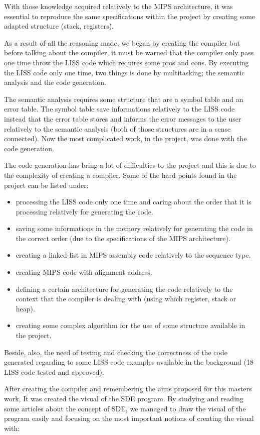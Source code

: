 \documentclass[
  oneside,
  11pt, a4paper,
  footinclude=true,
  headinclude=true,
  cleardoublepage=empty
]{scrbook}
\begin{document}
With those knowledge acquired relatively to the MIPS architecture, it was essential to reproduce the same specifications within the project by creating some adapted structure (stack, registers).

As a result of all the reasoning made, we began by creating the compiler but before talking about the compiler, it must be warned that the compiler only pass one time throw the LISS code which requires some pros and cons. By executing the LISS code only one time, two things is done by multitasking; the semantic analysis and the code generation. 

The semantic analysis requires some structure that are a symbol table and an error table.
The symbol table save informations relatively to the LISS code instead that the error table stores and informs the error messages to the user relatively to the semantic analysis (both of those structures are in a sense connected). Now the most complicated work, in the project, was done with the code generation.

The code generation has bring a lot of difficulties to the project and this is due to the complexity of creating a compiler.
Some of the hard points found in the project can be listed under:
\begin{itemize}
\item processing the LISS code only one time and  caring about the order that it is processing relatively for generating the code.
\item saving some informations in the memory relatively for generating the code in the correct order (due to the specifications of the MIPS architecture).
\item creating a linked-list in MIPS assembly code relatively to the sequence type.
\item creating MIPS code with alignment address.
\item defining a certain architecture for generating the code relatively to the context that the compiler is dealing with (using which register, stack or heap).
\item creating some complex algorithm for the use of some structure available in the project.
\end{itemize}

Beside, also, the need of testing and checking the correctness of the code generated regarding to some LISS code examples available in the background (18 LISS code tested and approved).

After creating the compiler and remembering the aims proposed for this masters work, It was created the visual of the SDE program. By studying and reading some articles about the concept of SDE, we managed to draw the visual of the program easily and focusing on the most important notions of creating the visual with:
\end{document}
